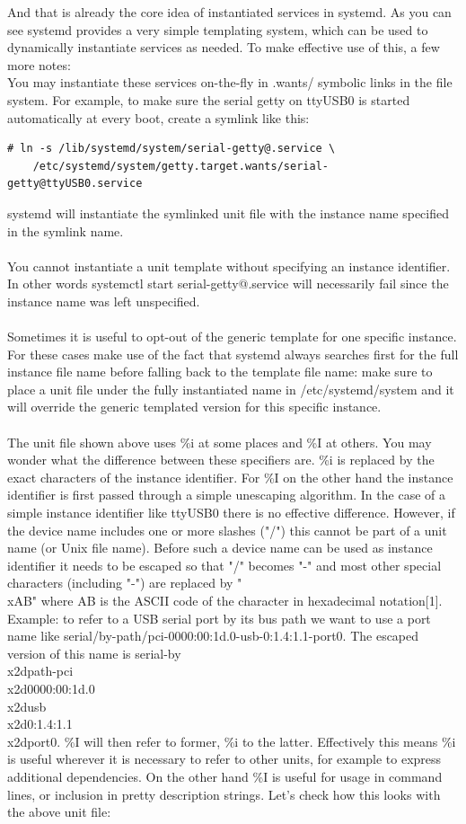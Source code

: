 \documentclass[titlepage]{article}
\begin{document}
And that is already the core idea of instantiated services in systemd. As you can see systemd provides a very simple templating system, which can be used to dynamically instantiate services as needed. To make effective use of this, a few more notes:
\\
You may instantiate these services on-the-fly in .wants/ symbolic links in the file system. For example, to make sure the serial getty on ttyUSB0 is started automatically at every boot, create a symlink like this:
\begin{lstlisting}
# ln -s /lib/systemd/system/serial-getty@.service \
    /etc/systemd/system/getty.target.wants/serial-getty@ttyUSB0.service
\end{lstlisting}
systemd will instantiate the symlinked unit file with the instance name specified in the symlink name.
\\
\\
You cannot instantiate a unit template without specifying an instance identifier. In other words systemctl start serial-getty@.service will necessarily fail since the instance name was left unspecified.
\\
\\
Sometimes it is useful to opt-out of the generic template for one specific instance. For these cases make use of the fact that systemd always searches first for the full instance file name before falling back to the template file name: make sure to place a unit file under the fully instantiated name in /etc/systemd/system and it will override the generic templated version for this specific instance.
\\
\\
The unit file shown above uses \%i at some places and \%I at others. You may wonder what the difference between these specifiers are. \%i is replaced by the exact characters of the instance identifier. For \%I on the other hand the instance identifier is first passed through a simple unescaping algorithm. In the case of a simple instance identifier like ttyUSB0 there is no effective difference. However, if the device name includes one or more slashes ("/") this cannot be part of a unit name (or Unix file name). Before such a device name can be used as instance identifier it needs to be escaped so that "/" becomes "-" and most other special characters (including "-") are replaced by "\\xAB" where AB is the ASCII code of the character in hexadecimal notation[1]. Example: to refer to a USB serial port by its bus path we want to use a port name like serial/by-path/pci-0000:00:1d.0-usb-0:1.4:1.1-port0. The escaped version of this name is serial-by\\x2dpath-pci\\x2d0000:00:1d.0\\x2dusb\\x2d0:1.4:1.1\\x2dport0. \%I will then refer to former, \%i to the latter. Effectively this means \%i is useful wherever it is necessary to refer to other units, for example to express additional dependencies. On the other hand \%I is useful for usage in command lines, or inclusion in pretty description strings. Let's check how this looks with the above unit file:
\end{document}

